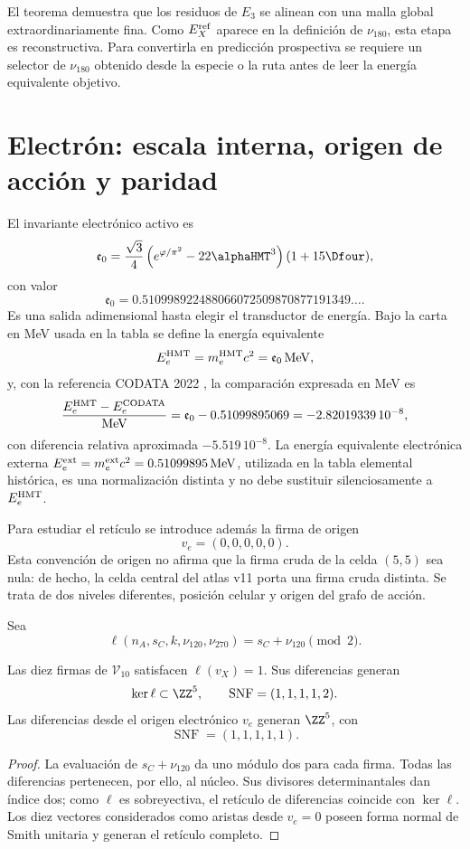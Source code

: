 El teorema demuestra que los residuos de \(E_3\) se alinean con una malla
global extraordinariamente fina. Como \(E_X^{\rm ref}\) aparece en la
definición de \(\nu_{180}\), esta etapa es reconstructiva. Para convertirla
en predicción prospectiva se requiere un selector de \(\nu_{180}\) obtenido
desde la especie o la ruta antes de leer la energía equivalente objetivo.

\section{Electrón: escala interna, origen de acción y paridad}

El invariante electrónico activo es
\[
 \mathfrak e_0=
 \frac{\sqrt3}{4}
 \left(e^{\varphi/\pi^2}-22\alphaHMT^3\right)
 (1+15\Dfour),
\]
con valor
\[
 \mathfrak e_0=
 0.510998922488066072509870877191349\ldots.
\]
Es una salida adimensional hasta elegir el transductor de energía. Bajo la
carta en MeV usada en la tabla se define la energía equivalente
\[
 E_e^{\rm HMT}=m_e^{\rm HMT}c^2
 =\mathfrak e_0\,\mathrm{MeV},
\]
y, con la referencia CODATA 2022 \cite{CODATA2022}, la comparación expresada
en MeV es
\[
 \frac{E_e^{\rm HMT}-E_e^{\rm CODATA}}{\mathrm{MeV}}
 =\mathfrak e_0-0.51099895069
 =-2.82019339\,10^{-8},
\]
con diferencia relativa aproximada
\(-5.519\,10^{-8}\). La energía equivalente electrónica externa
\(E_e^{\rm ext}=m_e^{\rm ext}c^2
=0.51099895\,\mathrm{MeV}\), utilizada en la tabla elemental histórica, es
una normalización distinta y no debe sustituir silenciosamente a
\(E_e^{\rm HMT}\).

Para estudiar el retículo se introduce además la firma de origen
\[
 v_e=(0,0,0,0,0).
\]
Esta convención de origen no afirma que la firma cruda de la celda \((5,5)\)
sea nula: de hecho, la celda central del atlas v11 porta una firma cruda
distinta. Se trata de dos niveles diferentes, posición celular y origen del
grafo de acción.

Sea
\[
 \ell(n_A,s_C,k,\nu_{120},\nu_{270})
 =s_C+\nu_{120}\pmod2.
\]

\begin{theorem}
\label{thm:paridad-electron-atlas}
Las diez firmas de \(\mathcal V_{10}\) satisfacen \(\ell(v_X)=1\). Sus
diferencias generan
\[
 \ker\ell\subset\ZZ^5,
 \qquad
 \operatorname{SNF}=(1,1,1,1,2).
\]
Las diferencias desde el origen electrónico \(v_e\) generan \(\ZZ^5\), con
\[
 \operatorname{SNF}=(1,1,1,1,1).
\]
\end{theorem}
\begin{proof}
La evaluación de \(s_C+\nu_{120}\) da uno módulo dos para cada firma. Todas
las diferencias pertenecen, por ello, al núcleo. Sus divisores
determinantales dan índice dos; como \(\ell\) es sobreyectiva, el retículo de
diferencias coincide con \(\ker\ell\). Los diez vectores considerados como
aristas desde \(v_e=0\) poseen forma normal de Smith unitaria y generan el
retículo completo.
\end{proof}

